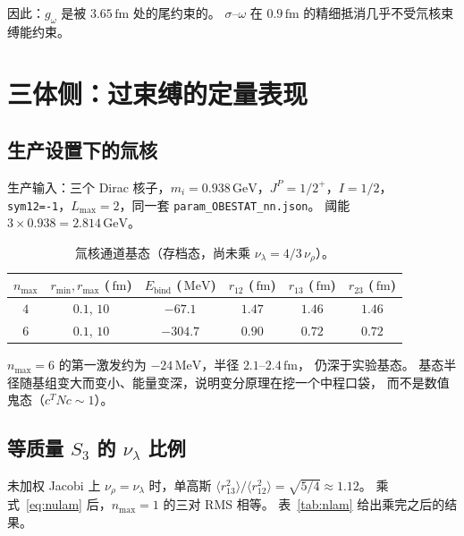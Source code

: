 \documentclass[12pt,a4paper]{article}
\newcommand{\GeV}{\,\mathrm{GeV}}
\newcommand{\MeV}{\,\mathrm{MeV}}
\newcommand{\fm}{\,\mathrm{fm}}
\begin{document}
因此：$g_\omega$ 是被 $3.65\fm$ 处的尾约束的。
$\sigma$--$\omega$ 在 $0.9\fm$ 的精细抵消几乎不受氘核束缚能约束。

\section{三体侧：过束缚的定量表现}

\subsection{生产设置下的氚核}

生产输入：三个 Dirac 核子，$m_i=0.938\GeV$，$J^P=1/2^+$，$I=1/2$，
\texttt{sym12=-1}，$L_{\max}=2$，同一套 \texttt{param\_OBESTAT\_nn.json}。
阈能 $3\times 0.938=2.814\GeV$。

\begin{table}[htbp]
\centering
\caption{氚核通道基态（存档态，尚未乘 $\nu_\lambda=4/3\,\nu_\rho$）。}
\label{tab:nnn-prod}
\begin{tabular}{@{}cccccc@{}}
\toprule
$n_{\max}$ & $r_{\min},r_{\max}$ ($\fm$) & $E_{\mathrm{bind}}$ ($\MeV$)
  & $r_{12}$ ($\fm$) & $r_{13}$ ($\fm$) & $r_{23}$ ($\fm$) \\
\midrule
$4$ & $0.1$, $10$ & $-67.1$ & $1.47$ & $1.46$ & $1.46$ \\
$6$ & $0.1$, $10$ & $-304.7$ & $0.90$ & $0.72$ & $0.72$ \\
\bottomrule
\end{tabular}
\end{table}

$n_{\max}=6$ 的第一激发约为 $-24\MeV$，半径 $2.1$--$2.4\fm$，
仍深于实验基态。
基态半径随基组变大而变小、能量变深，说明变分原理在挖一个中程口袋，
而不是数值鬼态（$c^T N c\sim 1$）。

\subsection{\texorpdfstring{等质量 $S_3$ 的 $\nu_\lambda$ 比例}{等质量 S3 的 nu\_lambda 比例}}

未加权 Jacobi 上 $\nu_\rho=\nu_\lambda$ 时，单高斯
$\langle r_{13}^2\rangle/\langle r_{12}^2\rangle=\sqrt{5/4}\approx 1.12$。
乘式~\eqref{eq:nulam} 后，$n_{\max}=1$ 的三对 RMS 相等。
表~\ref{tab:nlam} 给出乘完之后的结果。
\end{document}
